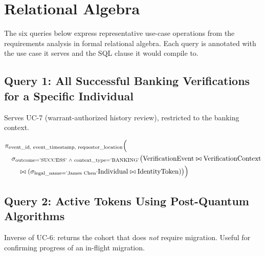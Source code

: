 \documentclass[11pt,letterpaper]{article}
\begin{document}
\section{Relational Algebra}
\label{sec:rel-algebra}

The six queries below express representative use-case operations from the requirements analysis in formal relational algebra. Each query is annotated with the use case it serves and the SQL clause it would compile to.

\subsection*{Query 1: All Successful Banking Verifications for a Specific Individual}

Serves UC-7 (warrant-authorized history review), restricted to the banking context.

\vspace{2pt}
\noindent
\begin{math}
\begin{aligned}
& \pi_{\text{event\_id, event\_timestamp, requestor\_location}} \Bigl( \\
& \quad \sigma_{\text{outcome='SUCCESS' } \land \text{ context\_type='BANKING'}} \bigl(
    \text{VerificationEvent} \bowtie \text{VerificationContext} \\
& \qquad {} \bowtie (\sigma_{\text{legal\_name='James Chen'}} \text{Individual} \bowtie \text{IdentityToken})
  \bigr) \Bigr)
\end{aligned}
\end{math}

\subsection*{Query 2: Active Tokens Using Post-Quantum Algorithms}

Inverse of UC-6: returns the cohort that does \textit{not} require migration. Useful for confirming progress of an in-flight migration.

\vspace{2pt}
\noindent{}
\end{document}

